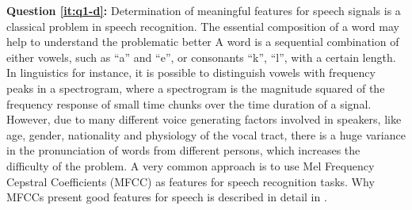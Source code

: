 \textbf{Question \ref{it:q1-d}:} 
Determination of meaningful features for speech signals is a classical problem in speech recognition.
The essential composition of a word may help to understand the problematic better
A word is a sequential combination of either vowels, such as \enquote{a} and \enquote{e}, or consonants \enquote{k}, \enquote{l}, with a certain length. 
In linguistics for instance, it is possible to distinguish vowels with frequency peaks in a spectrogram, where a spectrogram is the magnitude squared of the frequency response of small time chunks over the time duration of a signal.
However, due to many different voice generating factors involved in speakers, like age, gender, nationality and physiology of the vocal tract, there is a huge variance in the pronunciation of words from different persons, which increases the difficulty of the problem.
A very common approach is to use Mel Frequency Cepstral Coefficients (MFCC) as features for speech recognition tasks.
Why MFCCs present good features for speech is described in detail in .



